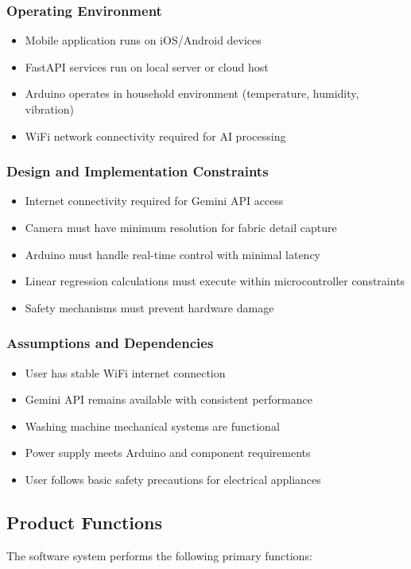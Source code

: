 \subsubsection*{Operating Environment}
\begin{itemize}
    \item Mobile application runs on iOS/Android devices
    \item FastAPI services run on local server or cloud host
    \item Arduino operates in household environment (temperature, humidity, vibration)
    \item WiFi network connectivity required for AI processing
\end{itemize}

\subsubsection*{Design and Implementation Constraints}
\begin{itemize}
    \item Internet connectivity required for Gemini API access
    \item Camera must have minimum resolution for fabric detail capture
    \item Arduino must handle real-time control with minimal latency
    \item Linear regression calculations must execute within microcontroller constraints
    \item Safety mechanisms must prevent hardware damage
\end{itemize}

\subsubsection*{Assumptions and Dependencies}
\begin{itemize}
    \item User has stable WiFi internet connection
    \item Gemini API remains available with consistent performance
    \item Washing machine mechanical systems are functional
    \item Power supply meets Arduino and component requirements
    \item User follows basic safety precautions for electrical appliances
\end{itemize}

\subsection{Product Functions}
The software system performs the following primary functions:

